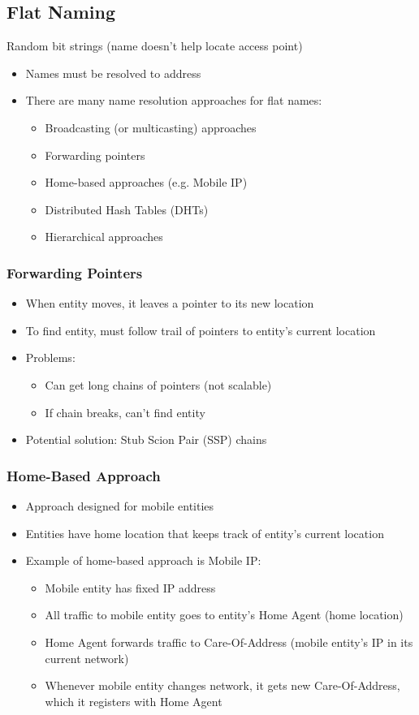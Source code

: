 \subsection{Flat Naming}
Random bit strings (name doesn't help locate access point)
\begin{itemize}
	\item Names must be resolved to address
	\item There are many name resolution approaches for flat names:
	\begin{itemize}
		\item Broadcasting (or multicasting) approaches
		\item Forwarding pointers
		\item Home-based approaches (e.g. Mobile IP)
		\item Distributed Hash Tables (DHTs)
		\item Hierarchical approaches
	\end{itemize}
\end{itemize}

\subsubsection{Forwarding Pointers}
\begin{itemize}
	\item When entity moves, it leaves a pointer to its new location
	\item To find entity, must follow trail of pointers to entity's current location
	\item Problems:
	\begin{itemize}
		\item Can get long chains of pointers (not scalable)
		\item If chain breaks, can't find entity
	\end{itemize}
	\item Potential solution:
	\subitem Stub Scion Pair (SSP) chains	
\end{itemize}

\subsubsection{Home-Based Approach}
\begin{itemize}
	\item Approach designed for mobile entities
	\item Entities have home location that keeps track of entity's current location
	\item Example of home-based approach is Mobile IP:
	\begin{itemize}
		\item Mobile entity has fixed IP address
		\item All traffic to mobile entity goes to entity's Home Agent (home location)
		\item Home Agent forwards traffic to Care-Of-Address (mobile entity's IP in its current network)
		\item Whenever mobile entity changes network, it gets new Care-Of-Address, which it registers with Home Agent
	\end{itemize}	
\end{itemize}

